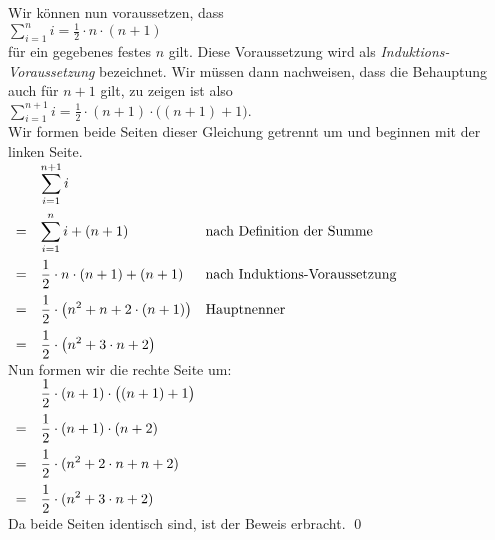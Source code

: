 \begin{enumerate}
      Wir können nun voraussetzen, dass
      \\[0.2cm]
      \hspace*{1.3cm}
      $\sum\limits_{i=1}^n i = \frac{1}{2} \cdot n \cdot (n+1)$
      \\[0.2cm]
      für ein gegebenes festes $n$ gilt.  Diese Voraussetzung wird als \emph{Induktions-Voraussetzung}
      bezeichnet.  Wir müssen dann nachweisen, dass  die Behauptung auch
      für $n+1$ gilt, zu zeigen ist also 
      \\[0.2cm]
      \hspace*{1.3cm}
      $\sum\limits_{i=1}^{n+1} i = \frac{1}{2} \cdot (n+1) \cdot \bigl((n+1)+1\bigr)$.
      \\[0.2cm]
      Wir formen beide Seiten dieser Gleichung getrennt um und beginnen mit der linken Seite.
      \\[0.2cm]
      \hspace*{1.3cm}
      $
      \begin{array}[t]{cll}
        &\displaystyle \sum\limits_{i=1}^{n+1} i                                                       \\[0.5cm]
      = &\displaystyle \sum\limits_{i=1}^{n} i + (n+1)          & \mbox{nach Definition der Summe}     \\[0.5cm]
      = &\displaystyle \frac{1}{2} \cdot n \cdot (n+1) + (n+1)  & \mbox{nach Induktions-Voraussetzung} \\[0.3cm]
      = &\displaystyle \frac{1}{2} \cdot \bigl( n^2 + n  + 2 \cdot(n+1)\bigr)  & \mbox{Hauptnenner} \\[0.3cm]
      = &\displaystyle \frac{1}{2} \cdot \bigl( n^2 + 3 \cdot n  + 2 \bigr)  
      \end{array}
      $
      \\[0.2cm]
      Nun formen wir die rechte Seite um:
      \\[0.2cm]
      \hspace*{1.3cm}
      $
      \begin{array}[t]{cl}
         &\displaystyle \frac{1}{2} \cdot (n+1) \cdot \bigl((n+1)+1\bigr) \\[0.3cm]
       = &\displaystyle \frac{1}{2} \cdot (n+1) \cdot (n+2)               \\[0.3cm]
       = & \displaystyle \frac{1}{2} \cdot (n^2  + 2 \cdot n + n + 2)     \\[0.3cm]
       = &\displaystyle \frac{1}{2} \cdot (n^2  + 3 \cdot n + 2)  
      \end{array}
      $
      \\[0.2cm]
      Da beide Seiten identisch sind, ist der Beweis erbracht. \qed
\end{enumerate}


